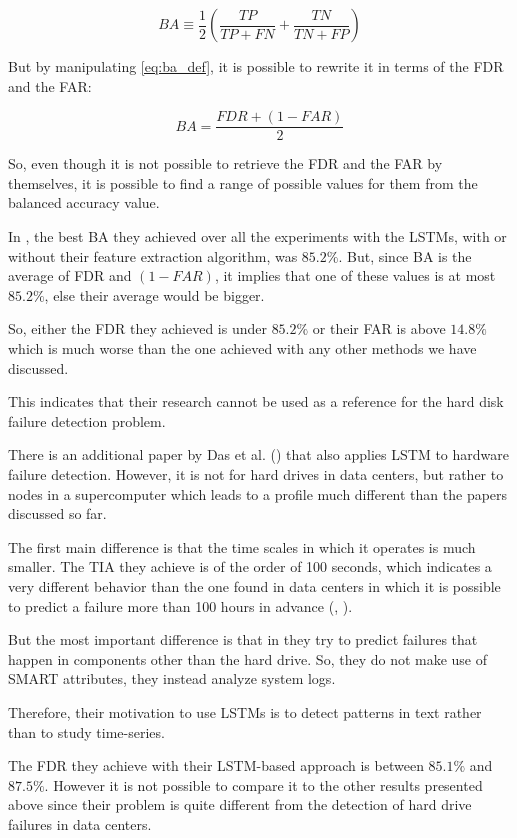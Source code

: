 \begin{equation}\label{eq:ba_def}
    BA \equiv \dfrac{1}{2}\left(\dfrac{TP}{TP + FN} + \dfrac{TN}{TN + FP}\right)
\end{equation}

But by manipulating \ref{eq:ba_def}, it is possible to rewrite it in terms of the FDR and the FAR:

\begin{equation}
    BA = \dfrac{FDR + (1-FAR)}{2}
\end{equation}

So, even though it is not possible to retrieve the FDR and the FAR by themselves, it is possible to find a range of possible values for them from the balanced accuracy value.

In \cite{zhang2017deep}, the best BA they achieved over all the experiments with the LSTMs, with or without their feature extraction algorithm, was $85.2\%$.
But, since BA is the average of FDR and $(1-FAR)$, it implies that one of these values is at most $85.2\%$, else their average would be bigger.

So, either the FDR they achieved is under $85.2\%$ or their FAR is above $14.8\%$ which is much worse than the one achieved with any other methods we have discussed.

This indicates that their research cannot be used as a reference for the hard disk failure detection problem.

There is an additional paper by Das et al. (\cite{das2018desh}) that also applies LSTM to hardware failure detection.
However, it is not for hard drives in data centers, but rather to nodes in a supercomputer which leads to a profile much different than the papers discussed so far.

The first main difference is that the time scales in which it operates is much smaller.
The TIA they achieve is of the order of 100 seconds, which indicates a very different behavior than the one found in data centers in which it is possible to predict a failure more than 100 hours in advance (\cite{Li14}, \cite{Zhu13}).

But the most important difference is that in \cite{das2018desh} they try to predict failures that happen in components other than the hard drive.
So, they do not make use of SMART attributes, they instead analyze system logs.

Therefore, their motivation to use LSTMs is to detect patterns in text rather than to study time-series.

The FDR they achieve with their LSTM-based approach is between $85.1\%$ and $87.5\%$.
However it is not possible to compare it to the other results presented above since their problem is quite different from the detection of hard drive failures in data centers.

